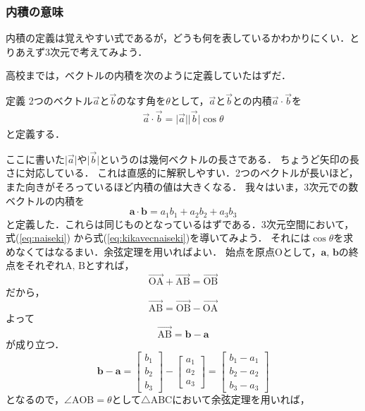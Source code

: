 \subsubsection{内積の意味}
内積の定義は覚えやすい式であるが，どうも何を表しているかわかりにくい．とりあえず3次元で考えてみよう．

高校までは，ベクトルの内積を次のように定義していたはずだ．
\begin{itembox}[l]{定義}
2つのベクトル$\vec{a}$と$\vec{b}$のなす角を$\theta$として，$\vec{a}$と$\vec{b}$との内積$\vec{a} \cdot \vec{b}$を
\begin{align}
\vec{a} \cdot \vec{b} = \lvert \vec{a} \rvert \lvert \vec{b} \rvert \cos \theta
\label{eq:kikavecnaiseki}
\end{align}
と定義する．
\end{itembox}
ここに書いた$\lvert \vec{a} \rvert$や$\lvert \vec{b} \rvert$というのは幾何ベクトルの長さである．
ちょうど矢印の長さに対応している．
これは直感的に解釈しやすい．2つのベクトルが長いほど，また向きがそろっているほど内積の値は大きくなる．
我々はいま，3次元での数ベクトルの内積を
$$
\bm{a} \cdot \bm{b} = a_1 b_1 + a_2 b_2 + a_3 b_3
$$
と定義した．これらは同じものとなっているはずである．3次元空間において，式(\ref{eq:naiseki})
から式(\ref{eq:kikavecnaiseki})を導いてみよう．
それには$\cos \theta$を求めなくてはなるまい．余弦定理を用いればよい．
始点を原点$\mathrm{O}$として，$\bm{a}, \, \bm{b}$の終点をそれぞれ$\mathrm{A}, \, \mathrm{B}$とすれば，
$$
\overrightarrow{\mathrm{OA}}+\overrightarrow{\mathrm{AB}}=\overrightarrow{\mathrm{OB}}
$$
だから，
$$
\overrightarrow{\mathrm{AB}}=\overrightarrow{\mathrm{OB}} - \overrightarrow{\mathrm{OA}}
$$
よって
$$
\overrightarrow{\mathrm{AB}} = \bm{b} - \bm{a}
$$
が成り立つ．
$$
\bm{b} - \bm{a} = \left[
 \begin{array}{c}
  b_1 \\
  b_2 \\
  b_3 
  \end{array}
\right]
-
\left[
\begin{array}{c}
 a_1 \\
 a_2 \\ 
 a_3
 \end{array}
 \right]
 =
 \left[
 \begin{array}{c}
  b_1 - a_1 \\
  b_2 - a_2 \\
  b_3 - a_3
  \end{array}
 \right]
$$
となるので，$\angle \mathrm{AOB} = \theta$として$\triangle \mathrm{ABC}$において余弦定理を用いれば，
